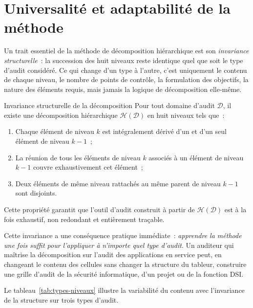 \section{Universalité et adaptabilité de la méthode}
\label{sec:universalite}

Un trait essentiel de la méthode de décomposition hiérarchique est son
\emph{invariance structurelle}~: la succession des huit niveaux reste identique
quel que soit le type d'audit considéré. Ce qui change d'un type à l'autre,
c'est uniquement le contenu de chaque niveau, le nombre de points de
contrôle, la formulation des objectifs, la nature des éléments requis, mais
jamais la logique de décomposition elle-même.

\begin{boiteTheoreme}{Invariance structurelle de la décomposition}
Pour tout domaine d'audit $\mathcal{D}$, il existe une décomposition
hiérarchique $\mathcal{H}(\mathcal{D})$ en huit niveaux tels que~:
\begin{enumerate}
  \item Chaque élément de niveau $k$ est intégralement dérivé d'un et d'un seul
        élément de niveau $k-1$~;
  \item La réunion de tous les éléments de niveau $k$ associés à un élément
        de niveau $k-1$ couvre exhaustivement cet élément~;
  \item Deux éléments de même niveau rattachés au même parent de niveau
        $k-1$ sont disjoints.
\end{enumerate}
Cette propriété garantit que l'outil d'audit construit à partir de
$\mathcal{H}(\mathcal{D})$ est à la fois exhaustif, non redondant et
entièrement traçable.
\end{boiteTheoreme}

Cette invariance a une conséquence pratique immédiate~: \emph{apprendre la
méthode une fois suffit pour l'appliquer à n'importe quel type d'audit}. Un
auditeur qui maîtrise la décomposition sur l'audit des applications en service
peut, en changeant le contenu des cellules sans changer la structure du tableur,
construire une grille d'audit de la sécurité informatique, d'un projet ou de la
fonction DSI.

Le tableau~\ref{tab:types-niveaux} illustre la variabilité du contenu avec
l'invariance de la structure sur trois types d'audit.

